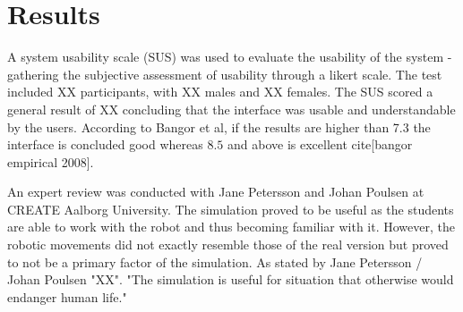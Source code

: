 \section{Results}
A system usability scale (SUS) was used to evaluate the usability of the system - gathering the subjective assessment of usability through a likert scale. The test included XX participants, with XX males and XX females. The SUS scored a general result of XX concluding that the interface was usable and understandable by the users. According to Bangor et al, if the results are higher than 7.3 the interface is concluded good whereas $8.5$ and above is excellent cite[bangor empirical 2008].

An expert review was conducted with Jane Petersson and Johan Poulsen at CREATE Aalborg University. The simulation proved to be useful as the students are able to work with the robot and thus becoming familiar with it. However, the robotic movements did not exactly resemble those of the real version but proved to not be a primary factor of the simulation. As stated by Jane Petersson / Johan Poulsen "XX". "The simulation is useful for situation that otherwise would endanger human life."